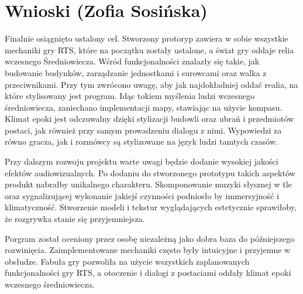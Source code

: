 \section{Wnioski (Zofia Sosińska)}
Finalnie osiągnięto ustalony cel. Stworzony protoryp zawiera w sobie wszystkie mechaniki gry RTS,
które na początku zostały ustalone, a świat gry oddaje relia wczesnego Średniowiecza. 
Wśród funkcjonalności znalazły się takie, jak budowanie budynków, zarządzanie
jednostkami i surowcami oraz walka z przeciwnikami. Przy tym zwrócono uwagę, aby jak najdokładniej oddać 
realia, na które stylisowany jest program. Idąc tokiem myślenia ludzi wczesnego średniowiecza, zaniechano
implementacji mapy, stawiając na użycie kompasu. Klimat epoki jest odczuwalny dzięki stylizacji budowli oraz ubrań i przedmiotów postaci,
jak również przy samym prowadzeniu dialogu z nimi. Wypowiedzi za równo gracza, jak i rozmówcy są stylizowane na język ludzi tamtych czasów.

Przy dalszym rozwoju projektu warte uwagi będzie dodanie wysokiej jakości efektów audiowizualnych. Po dodaniu do stworzonego prototypu takich
aspektów produkt nabrałby unikalnego charakteru. Skomponowanie muzyki słysznej w tle oraz sygnalizującej wykonanie jakiejś czynności podniosło by immersyjność i klimatyczność.
Stworzenie modeli i tekstur wyglądających estetycznie sprawiłoby, że rozgrywka stanie się przyjemniejsza.

Porgram został oceniony przez osobę niezależną jako dobra baza do późniejszego rozwinięcia. Zaimplementowane mechaniki często były intuicyjne i przyjemne
w obsłudze. Fabuła gry pozwoliła na użycie wszystkich zaplanowanych funkcjonalności gry RTS, a otoczenie i dialogi z postaciami oddały klimat
epoki wczesnego średniowiecza.